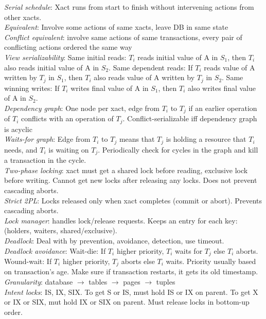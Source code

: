 \documentclass[10pt,landscape]{article}
\begin{document}
\begin{multicols}{3}
\textit{Serial schedule}: Xact runs from start to finish without intervening actions from other xacts. \\
\textit{Equivalent}: Involve some actions of same xacts, leave DB in same state \\
\textit{Conflict equivalent}: involve same actions of same transactions, every pair of conflicting actions ordered the same way \\
\textit{View serializability}: Same initial reads: $T_i$ reads initial value of A in $S_1$, then $T_i$ also reads initial value of A in $S_2$. Same dependent reads: If $T_i$ reads value of A written by $T_j$ in $S_1$, then $T_i$ also reads value of A written by $T_j$ in $S_2$. Same winning writes: If $T_i$ writes final value of A in $S_1$, then $T_i$ also writes final value of A in $S_2$. \\
\textit{Dependency graph}: One node per xact, edge from $T_i$ to $T_j$ if an earlier operation of $T_i$ conflicts with an operation of $T_j$. Conflict-serializable iff dependency graph is acyclic \\
\textit{Waits-for graph}: Edge from $T_i$ to $T_j$ means that $T_j$ is holding a resource that $T_i$ needs, and $T_i$ is waiting on $T_j$. Periodically check for cycles in the graph and kill a transaction in the cycle. \\
\textit{Two-phase locking}: xact must get a shared lock before reading, exclusive lock before writing. Cannot get new locks after releasing any locks. Does not prevent cascading aborts. \\
\textit{Strict 2PL}: Locks released only when xact completes (commit or abort). Prevents cascading aborts. \\
\textit{Lock manager}: handles lock/release requests. Keeps an entry for each key: (holders, waiters, shared/exclusive). \\
\textit{Deadlock}: Deal with by prevention, avoidance, detection, use timeout. \\
\textit{Deadlock avoidance}: Wait-die: If $T_i$ higher priority, $T_i$ waits for $T_j$ else $T_i$ aborts. Wound-wait: If $T_i$ higher priority, $T_j$ aborts else $T_i$ waits. Priority usually based on transaction's age. Make sure if transaction restarts, it gets its old timestamp. \\
\textit{Granularity}: database $\rightarrow$ tables $\rightarrow$ pages $\rightarrow$ tuples \\
\textit{Intent locks}: IS, IX, SIX. To get S or IS, must hold IS or IX on parent. To get X or IX or SIX, mut hold IX or SIX on parent. Must release locks in bottom-up order.



\end{multicols}
\end{document}

